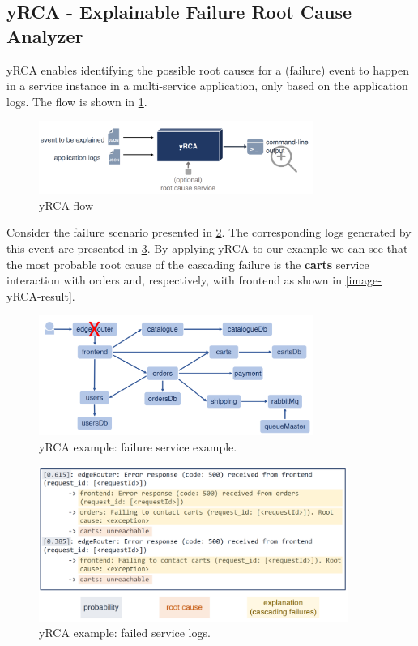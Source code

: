 \documentclass[10pt,a4paper]{report}
\begin{document}
\subsection{yRCA - Explainable Failure Root Cause Analyzer}
yRCA enables identifying the possible root causes for a (failure) event to happen in a service instance in a multi-service application, only based on the application logs. The flow is shown in \ref{image-yRCA-flow}. 
\begin{figure}[h]
	\centering
	\includegraphics[width=0.8\textwidth]{image-yRCA-flow}
	\caption{yRCA flow}
	\label{image-yRCA-flow}
\end{figure}

Consider the failure scenario presented in \ref{image-yRCA-example}. The corresponding logs generated by this event are presented in \ref{image-yRCA}.  By applying yRCA to our example we can see that the most probable root cause of the cascading failure is the \textbf{carts} service interaction with orders and, respectively, with frontend as shown in \ref{image-yRCA-result}. 
\begin{figure}[h]
	\centering
	\includegraphics[width=0.8\textwidth]{image-yRCA-example}
	\caption{yRCA example: failure service example.}
	\label{image-yRCA-example}
\end{figure}

\begin{figure}[h]
	\centering
	\includegraphics[width=0.9\textwidth]{image-yRCA}
	\caption{yRCA example: failed service logs.}
	\label{image-yRCA}
\end{figure}
\end{document}
